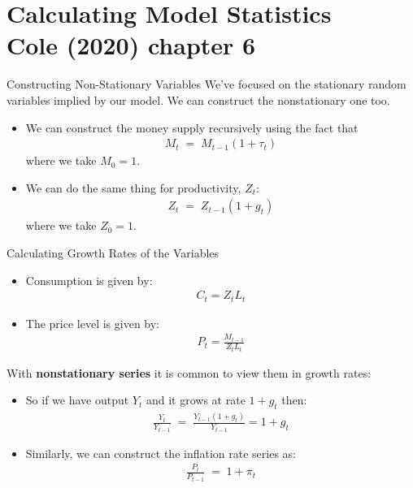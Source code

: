 \documentclass[10pt,c,aspectratio=1610,handout]{beamer}
\begin{document}
\section{Calculating Model Statistics\\{\small Cole (2020) chapter 6}}%
\begin{frame}{Constructing Non-Stationary Variables}%
  We've focused on the stationary random variables implied by our model. We can construct the nonstationary one too.%
  \pause%
  \begin{itemize}%
    \item[$\blacktriangleright$] We can construct the money supply recursively using the fact that%
    \begin{align*}%
      M_{t} \; = \; M_{t-1}\left(1+\tau _{t}\right)%
    \end{align*}%
    where we take $M_{0}=1$.%
    \medskip%
    \pause%
    \item[$\blacktriangleright$] We can do the same thing for productivity, $Z_{t}$:%
    \begin{align*}%
      Z_t \; = \; Z_{t-1} \left(1 + g_t\right)%
    \end{align*}%
    where we take $Z_{0}=1$.%
  \end{itemize}%
\end{frame}%
\begin{frame}{Calculating Growth Rates of the Variables}%
  \begin{itemize}%
    \item[$\blacktriangleright$] Consumption is given by:%
    \begin{align*}%
      C_{t}=Z_{t}L_{t}%
    \end{align*}%
    \item[$\blacktriangleright$] The price level is given by:%
    \begin{align*}%
      P_{t}=\frac{M_{t-1}}{Z_{t}L_{t}}%
    \end{align*}%
  \end{itemize}%
  \bigskip%
  \pause%
  With \textbf{nonstationary series} it is common to view them in growth rates:%
  \begin{itemize}%
    \item[$\blacktriangleright$] So if we have output $Y_t$ and it grows at rate $1+g_t$ then:
    \begin{align*}%
      \frac{Y_t}{Y_{t-1}} \; = \; \frac{Y_{t-1}(1+g_t)}{Y_{t-1}}  = 1+g_t%
    \end{align*}%
    \item[$\blacktriangleright$] Similarly, we can construct the inflation rate series as:
    \begin{align*}%
      \frac{P_t}{P_{t-1}} \; = \; 1+\pi_t%
    \end{align*}%
  \end{itemize}%
\end{frame}%
\end{document}
